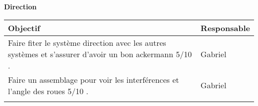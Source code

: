 \hfill \break
\textbf{\large Direction}\\
\begin{tabularx}{\linewidth}{
    |>{\hsize=1.75\hsize}X|%
    >{\hsize=0.25\hsize}X|%
  }
    \hline
    \textbf{Objectif} & \textbf{Responsable} \\\hline
        Faire fiter le système direction avec les autres systèmes et s'assurer d'avoir un bon ackermann 5/10 .&Gabriel
        \\\hline 
        Faire un assemblage pour voir les interférences et l'angle des roues 5/10 .&Gabriel
        \\\hline
       & \\\hline 
\end{tabularx}



